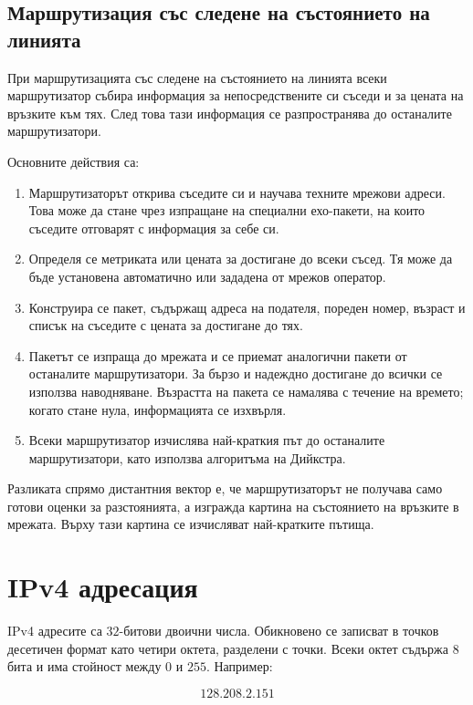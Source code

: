 \subsection{Маршрутизация със следене на състоянието на линията}\label{s:13.3.2}

При маршрутизацията със следене на състоянието на линията всеки маршрутизатор събира информация за непосредствените си съседи и за цената на връзките към тях. След това тази информация се разпространява до останалите маршрутизатори.

Основните действия са:

\begin{enumerate}
    \item Маршрутизаторът открива съседите си и научава техните мрежови адреси. Това може да стане чрез изпращане на специални ехо-пакети, на които съседите отговарят с информация за себе си.
    \item Определя се метриката или цената за достигане до всеки съсед. Тя може да бъде установена автоматично или зададена от мрежов оператор.
    \item Конструира се пакет, съдържащ адреса на подателя, пореден номер, възраст и списък на съседите с цената за достигане до тях.
    \item Пакетът се изпраща до мрежата и се приемат аналогични пакети от останалите маршрутизатори. За бързо и надеждно достигане до всички се използва наводняване. Възрастта на пакета се намалява с течение на времето; когато стане нула, информацията се изхвърля.
    \item Всеки маршрутизатор изчислява най-краткия път до останалите маршрутизатори, като използва алгоритъма на Дийкстра.
\end{enumerate}

Разликата спрямо дистантния вектор е, че маршрутизаторът не получава само готови оценки за разстоянията, а изгражда картина на състоянието на връзките в мрежата. Върху тази картина се изчисляват най-кратките пътища.

\section{IPv4 адресация}\label{s:13.4}

IPv4 адресите са $32$-битови двоични числа. Обикновено се записват в точков десетичен формат като четири октета, разделени с точки. Всеки октет съдържа $8$ бита и има стойност между $0$ и $255$. Например:

\[
128.208.2.151
\]

